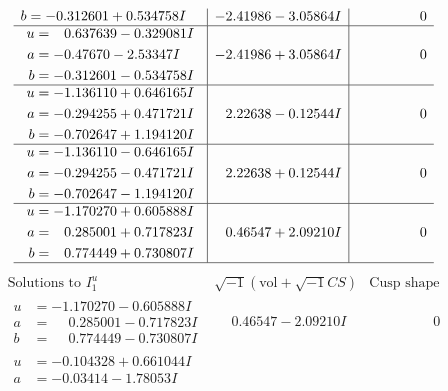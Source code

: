 \documentclass[1p]{elsarticle_modified}
\theoremstyle{definition}
\newcommand{\I}{\sqrt{-1}}
\begin{document}
$$\begin{array}{c|c|c}
\begin{aligned}
b &= -0.312601 + 0.534758 I\end{aligned}
 & -2.41986 - 3.05864 I & \phantom{-0.000000 } 0 \\ \hline\begin{aligned}
u &= \phantom{-}0.637639 - 0.329081 I \\
a &= -0.47670 - 2.53347 I \\
b &= -0.312601 - 0.534758 I\end{aligned}
 & -2.41986 + 3.05864 I & \phantom{-0.000000 } 0 \\ \hline\begin{aligned}
u &= -1.136110 + 0.646165 I \\
a &= -0.294255 + 0.471721 I \\
b &= -0.702647 + 1.194120 I\end{aligned}
 & \phantom{-}2.22638 - 0.12544 I & \phantom{-0.000000 } 0 \\ \hline\begin{aligned}
u &= -1.136110 - 0.646165 I \\
a &= -0.294255 - 0.471721 I \\
b &= -0.702647 - 1.194120 I\end{aligned}
 & \phantom{-}2.22638 + 0.12544 I & \phantom{-0.000000 } 0 \\ \hline\begin{aligned}
u &= -1.170270 + 0.605888 I \\
a &= \phantom{-}0.285001 + 0.717823 I \\
b &= \phantom{-}0.774449 + 0.730807 I\end{aligned}
 & \phantom{-}0.46547 + 2.09210 I & \phantom{-0.000000 } 0\\
 \hline 
 \end{array}$$\newpage$$\begin{array}{c|c|c}  
\text{Solutions to }I^u_{1}& \I (\text{vol} + \sqrt{-1}CS) & \text{Cusp shape}\\
 \hline 
\begin{aligned}
u &= -1.170270 - 0.605888 I \\
a &= \phantom{-}0.285001 - 0.717823 I \\
b &= \phantom{-}0.774449 - 0.730807 I\end{aligned}
 & \phantom{-}0.46547 - 2.09210 I & \phantom{-0.000000 } 0 \\ \hline\begin{aligned}
u &= -0.104328 + 0.661044 I \\
a &= -0.03414 - 1.78053 I \\

\end{aligned}
\end{array}$$
\end{document}
